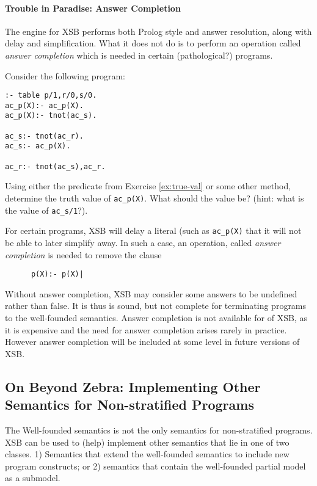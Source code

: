\paragraph*{Trouble in Paradise: Answer Completion}

The engine for XSB performs both Prolog style and answer resolution,
along with delay and simplification.  What it does not do is to
perform an operation called {\em answer completion} which is needed in
certain (pathological?) programs.

\begin{exercise}
Consider the following program:
\begin{verbatim}
:- table p/1,r/0,s/0.
ac_p(X):- ac_p(X).
ac_p(X):- tnot(ac_s).

ac_s:- tnot(ac_r).
ac_s:- ac_p(X).

ac_r:- tnot(ac_s),ac_r.
\end{verbatim}
Using either the predicate from Exercise \ref{ex:true-val} or some
other method, determine the truth value of {\tt ac\_p(X)}.  What
should the value be?  (hint: what is the value of {\tt ac\_s/1}?).
\end{exercise}

For certain programs, XSB will delay a literal (such as {\tt ac\_p(X)}
that it will not be able to later simplify away.  In such a case, an
operation, called {\em answer completion} is needed to remove the
clause
\begin{verbatim}
      p(X):- p(X)|
\end{verbatim}
Without answer completion, XSB may consider some answers to be
undefined rather than false.  It is thus is sound, but not complete
for terminating programs to the well-founded semantics.  Answer
completion is not available for \version{} of XSB, as it is expensive
and the need for answer completion arises rarely in practice.  However
answer completion will be included at some level in future versions of
XSB.

\subsection{On Beyond Zebra: Implementing Other Semantics for
Non-stratified Programs}

The Well-founded semantics is not the only semantics for
non-stratified programs.  XSB can be used to (help) implement other
semantics that lie in one of two classes.  1) Semantics that extend
the well-founded semantics to include new program constructs; or 2)
semantics that contain the well-founded partial model as a submodel.

